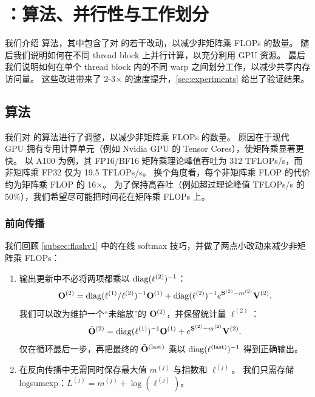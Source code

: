 \section{\sysname：算法、并行性与工作划分}
\label{sec:algo}

我们介绍 \sysname 算法，其中包含了对 \sysnameone 的若干改动，以减少非矩阵乘 FLOPs 的数量。
随后我们说明如何在不同 thread block 上并行计算，以充分利用 GPU 资源。
最后我们说明如何在单个 thread block 内的不同 warp 之间划分工作，以减少共享内存访问量。
这些改进带来了 2-3$\times$ 的速度提升，\cref{sec:experiments} 给出了验证结果。

\subsection{算法}
\label{subsec:algo}

我们对 \sysnameone 的算法进行了调整，以减少非矩阵乘 FLOPs 的数量。
原因在于现代 GPU 拥有专用计算单元（例如 Nvidia GPU 的 Tensor Cores），使矩阵乘显著更快。
以 A100 为例，其 FP16/BF16 矩阵乘理论峰值吞吐为 312 TFLOPs/s，而非矩阵乘 FP32 仅为 19.5 TFLOPs/s。
换个角度看，每个非矩阵乘 FLOP 的代价约为矩阵乘 FLOP 的 16$\times$。
为了保持高吞吐（例如超过理论峰值 TFLOPs/s 的 50\%），我们希望尽可能把时间花在矩阵乘 FLOPs 上。

\subsubsection{前向传播}

我们回顾 \cref{subsec:flashv1} 中的在线 softmax 技巧，并做了两点小改动来减少非矩阵乘 FLOPs：
\begin{enumerate}
  \item 输出更新中不必将两项都乘以 $\mathrm{diag}(\ell^{(2)})^{-1}$：
  \begin{equation*}
    \mathbf{O}^{(2)} = \mathrm{diag}(\ell^{(1)} / \ell^{(2)})^{-1} \mathbf{O}^{(1)} + \mathrm{diag}(\ell^{(2)})^{-1} e^{\mathbf{S}^{(2)} - m^{(2)}} \mathbf{V}^{(2)}.
  \end{equation*}
  我们可以改为维护一个“未缩放”的 $\mathbf{O}^{(2)}$，并保留统计量 $\ell^{(2)}$：
  \begin{equation*}
    \tilde{\mathbf{O}}^{(2)} = \mathrm{diag}(\ell^{(1)})^{-1} \mathbf{O}^{(1)} + e^{\mathbf{S}^{(2)} - m^{(2)}} \mathbf{V}^{(2)}.
  \end{equation*}
  仅在循环最后一步，再把最终的
  $\tilde{\mathbf{O}}^{(\mathrm{last})}$ 乘以 $\mathrm{diag}(\ell^{(\mathrm{last})})^{-1}$ 得到正确输出。

  \item 在反向传播中无需同时保存最大值 $m^{(j)}$ 与指数和 $\ell^{(j)}$。
  我们只需存储 logsumexp：$L^{(j)} = m^{(j)} + \log(\ell^{(j)})$。
\end{enumerate}

